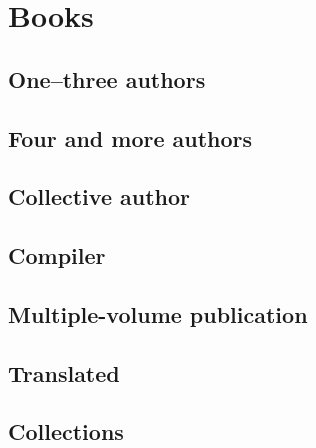 \documentclass[a4paper]{article}
\begin{document}
	

\newcommand{\bibentry}[1]{
\begin{bibunit}
\nocite{*}
\putbib[bib/#1]
\nopagebreak

\end{bibunit}
}

\title{\mytitle}
\maketitle
\begin{abstract}
  \mydescription
\end{abstract}

\bibliographyunit[\section]


\section{Books}
\subsection{One--three authors}
\bibentry{ex01}
\bibentry{ex02}
\bibentry{ex03}
\subsection{Four and more authors}
\bibentry{ex04}
\bibentry{ex05}
\subsection{Collective author}
\bibentry{ex06}
\subsection{Compiler}
\bibentry{ex06a}
\subsection{Multiple-volume publication}
\bibentry{ex07}
\bibentry{ex08}
\bibentry{ex09}
\subsection{Translated}
\bibentry{ex10}
\subsection{Collections}
\bibentry{ex12}
\end{document}
